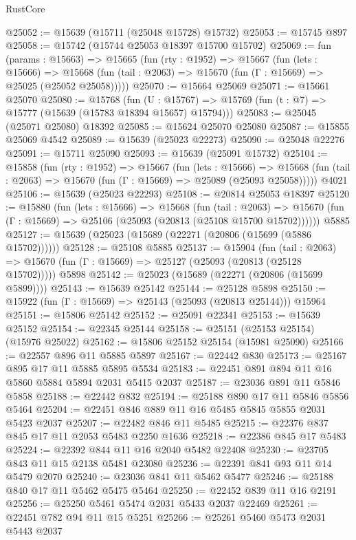 \begin{lexlean}{RustCore}
\begin{coremodule}
@25052 := @15639 (@15711 (@25048 @15728) @15732)
@25053 := @15745 @897
@25058 := @15742 (@15744 @25053 @18397 @15700 @15702)
@25069 := fun (params : @15663) =>
  @15665
    (fun (rty : @1952) =>
    @15667
      (fun (lets : @15666) =>
      @15668 (fun (tail : @2063) => @15670 (fun (Γ : @15669) => @25025 (@25052 @25058)))))
@25070 := @15664 @25069
@25071 := @15661 @25070
@25080 := @15768
    (fun (U : @15767) => @15769 (fun (t : @7) => @15777 (@15639 (@15783 @18394 @15657) @15794)))
@25083 := @25045 (@25071 @25080) @18392
@25085 := @15624 @25070 @25080
@25087 := @15855 @25069 @4542
@25089 := @15639 (@25023 @22273)
@25090 := @25048 @22276
@25091 := @15711 @25090
@25093 := @15639 (@25091 @15732)
@25104 := @15858
    (fun (rty : @1952) =>
    @15667
      (fun (lets : @15666) =>
      @15668 (fun (tail : @2063) => @15670 (fun (Γ : @15669) => @25089 (@25093 @25058)))))
    @4021
@25106 := @15639 (@25023 @22293)
@25108 := @20814 @25053 @18397
@25120 := @15880
    (fun (lets : @15666) =>
    @15668
      (fun (tail : @2063) =>
      @15670 (fun (Γ : @15669) => @25106 (@25093 (@20813 (@25108 @15700 @15702))))))
    @5885
@25127 := @15639 (@25023 (@15689 (@22271 (@20806 (@15699 (@5886 @15702))))))
@25128 := @25108 @5885
@25137 := @15904
    (fun (tail : @2063) => @15670 (fun (Γ : @15669) => @25127 (@25093 (@20813 (@25128 @15702)))))
    @5898
@25142 := @25023 (@15689 (@22271 (@20806 (@15699 @5899))))
@25143 := @15639 @25142
@25144 := @25128 @5898
@25150 := @15922 (fun (Γ : @15669) => @25143 (@25093 (@20813 @25144))) @15964
@25151 := @15806 @25142
@25152 := @25091 @22341
@25153 := @15639 @25152
@25154 := @22345 @25144
@25158 := @25151 (@25153 @25154) (@15976 @25022)
@25162 := @15806 @25152 @25154 (@15981 @25090)
@25166 := @22557 @896 @11 @5885 @5897
@25167 := @22442 @830
@25173 := @25167 @895 @17 @11 @5885 @5895 @5534
@25183 := @22451 @891 @894 @11 @16 @5860 @5884 @5894 @2031 @5415 @2037
@25187 := @23036 @891 @11 @5846 @5858
@25188 := @22442 @832
@25194 := @25188 @890 @17 @11 @5846 @5856 @5464
@25204 := @22451 @846 @889 @11 @16 @5485 @5845 @5855 @2031 @5423 @2037
@25207 := @22482 @846 @11 @5485
@25215 := @22376 @837 @845 @17 @11 @2053 @5483 @2250 @1636
@25218 := @22386 @845 @17 @5483
@25224 := @22392 @844 @11 @16 @2040 @5482 @22408
@25230 := @23705 @843 @11 @15 @2138 @5481 @23080
@25236 := @22391 @841 @93 @11 @14 @5479 @2070
@25240 := @23036 @841 @11 @5462 @5477
@25246 := @25188 @840 @17 @11 @5462 @5475 @5464
@25250 := @22452 @839 @11 @16 @2191
@25256 := @25250 @5461 @5474 @2031 @5433 @2037 @22469
@25261 := @22451 @782 @94 @11 @15 @5251
@25266 := @25261 @5460 @5473 @2031 @5443 @2037

\end{coremodule}
\end{lexlean}
